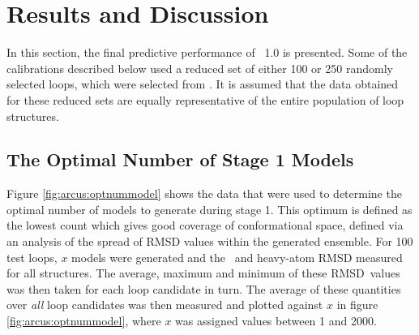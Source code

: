 \section{Results and Discussion}

In this section, the final predictive performance of \arcus\ 1.0 is presented. Some of the calibrations described below used a reduced set of either 100 or 250 randomly selected  loops, which were selected from \thothloopdb. It is assumed that the data obtained for these reduced sets are equally representative of the entire population of loop structures.
\subsection{The Optimal Number of Stage 1 Models}
\label{section:arcus:nummod}

Figure \ref{fig:arcus:optnummodel} shows the data that were used to determine the optimal number of models to generate during stage 1. This optimum is defined as the lowest count which gives good coverage of conformational space, defined via an analysis of the spread of RMSD values within the generated ensemble.
For 100 test loops, $x$ models were generated and the \mainchain\ and heavy-atom RMSD measured for all structures. The average, maximum and minimum of these RMSD\ values was then taken for each loop candidate in turn. The average of these quantities over \emph{all} loop candidates was then measured and plotted against $x$ in figure \ref{fig:arcus:optnummodel}, where $x$ was assigned values between 1 and 2000.

